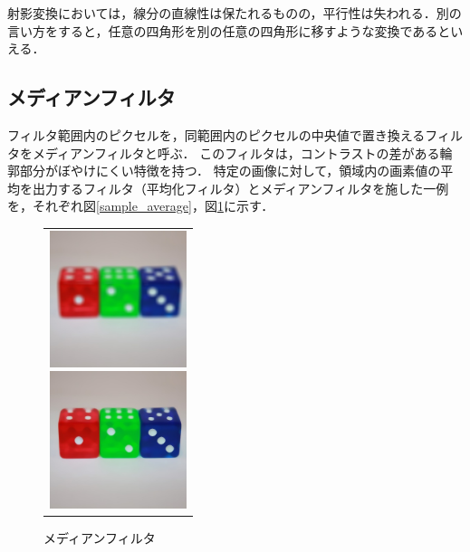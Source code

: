 \documentclass[openright]{nitocs}
\numberwithin{equation}{section}
\begin{document}
                射影変換においては，線分の直線性は保たれるものの，平行性は失われる．別の言い方をすると，任意の四角形を別の任意の四角形に移すような変換であるといえる．

        \subsection{メディアンフィルタ}
            フィルタ範囲内のピクセルを，同範囲内のピクセルの中央値で置き換えるフィルタをメディアンフィルタと呼ぶ．
            このフィルタは，コントラストの差がある輪郭部分がぼやけにくい特徴を持つ．
            特定の画像に対して，領域内の画素値の平均を出力するフィルタ（平均化フィルタ）とメディアンフィルタを施した一例を，それぞれ図\ref{sample_average}，図\ref{sample_median}に示す．
            \begin{figure}[tb] %
                \begin{center}
                  \begin{tabular}{c}
                    \begin{minipage}{0.5\hsize}
                      \begin{center}
                        \includegraphics[clip,width=40mm]{sample_average.jpg}
                    \caption{平均化フィルタ}
                    \label{sample_average}
                      \end{center}
                    \end{minipage}
                    \begin{minipage}{0.5\hsize}
                      \begin{center}
                        \includegraphics[clip,width=40mm]{sample_median.jpg}
                    \caption{メディアンフィルタ}
                    \label{sample_median}
                      \end{center}
                    \end{minipage}
                  \end{tabular}
                \end{center}
            \end{figure}
\end{document}
